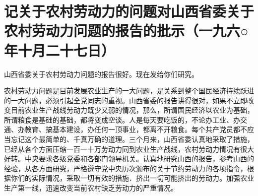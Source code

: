 \section[记关于农村劳动力的问题对山西省委关于农村劳动力问题的报告的批示（一九六○年十月二十七日）]{记关于农村劳动力的问题对山西省委关于农村劳动力问题的报告的批示（一九六○年十月二十七日）}


山西省委关于农村劳动力问题的报告很好。现在发给你们研究。

农村劳动力问题是目前发展农业生产的一大问题，是关系到整个国民经济持续跃进的一大问题，必须引起全党同志的重视。山西省委的报告讲得很对，如果不立即改变目前农业生产战线劳动力既少又弱的情况，那么，所谓国民经济以农业为基础，所谓粮食是基础的基础，都将变成空谈。人是每天要吃饭的，不论办工业、办交通、办教育、搞基本建设，办任何一顶事业，都离不开粮食。每个共产党员都不应当忘记这个最简单的、千真万确的道理。三个月来，山西省委认真地采取了措施，已经从各个方面压缩一百一十万劳动力同到农业生产战线，农村劳动力情况有很大好转。中央要求各级党委和各部门领导机关。认真地研究山西的报告，参考山西的经验，从各方面研究，严格遵守党中央历次颁布的关于节约劳动力的各项指令，根据你们的实际情况，采取一切有效的措施．挤出一切可能挤出的劳动力。加强农业生产第一线，迅速改变当前农村缺乏劳动力的严重情况。


